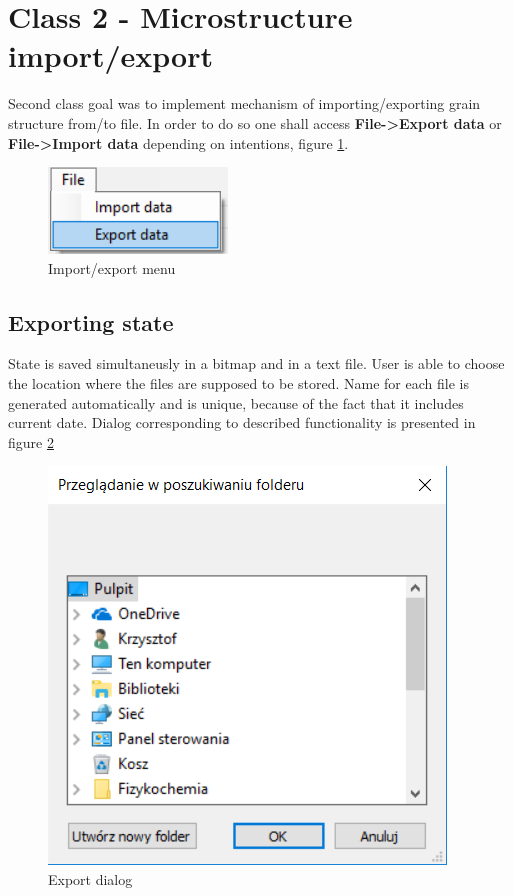 \documentclass[a4paper, 11pt]{article}
\begin{document}
\section*{Class 2 - Microstructure import/export}
Second class goal was to implement mechanism of importing/exporting grain structure from/to file. In order to do so one shall access \textbf{File->Export data} or \textbf{File->Import data} depending on intentions, figure \ref{FileLabel}.
\begin{figure}[H]
\centering
  \includegraphics{File}
  \caption{Import/export menu}
  \label{FileLabel}
\end{figure}
\subsection{Exporting state}
State is saved simultaneusly in a bitmap and in a text file. User is able to choose the location where the files are supposed to be stored. Name for each file is generated automatically and is unique, because of the fact that it includes current date. Dialog corresponding to described functionality is presented in figure \ref{ExportToLabel}

\begin{figure}[H]
\centering
  \includegraphics[]{ExportTo}
  \caption{Export dialog}
  \label{ExportToLabel}
\end{figure}
\end{document}

